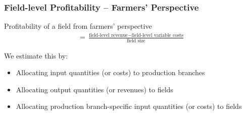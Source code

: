 \documentclass[t,24pt,aspectratio=169]{beamer}
\begin{document}
\begin{frame}[hvid]
\frametitle{\vspace{-3ex} Field-level Profitability -- Farmers' Perspective}
Profitability of a field from farmers' perspective
\begin{align*}
      = \frac{\text{field-level revenue} - \text{field-level variable costs}}{\text{field size}}
\end{align*}

\vspace{2ex}

We estimate this by:
\vspace{1.5ex}

\begin{itemize}
\setlength{\itemsep}{2.5ex}
\item Allocating input quantities (or costs) to production branches

\item Allocating output quantities (or revenues) to fields

\item Allocating production branch-specific input quantities (or costs) to fields
\end{itemize}
\end{frame}







\end{document}
